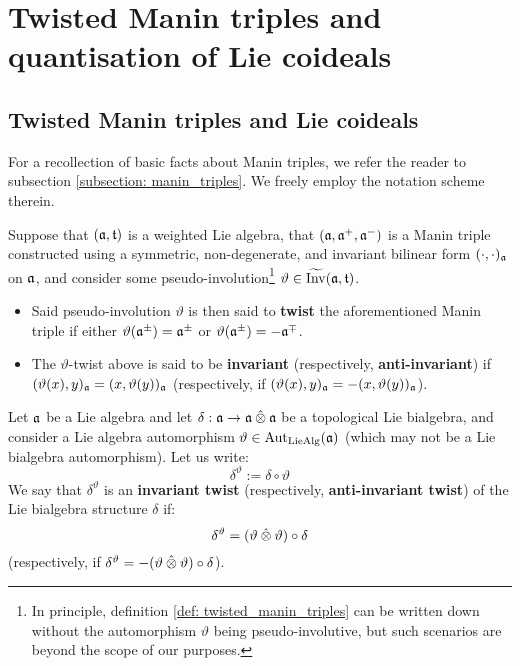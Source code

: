 \section{Twisted Manin triples and quantisation of Lie coideals}
    \subsection{Twisted Manin triples and Lie coideals}
        For a recollection of basic facts about Manin triples, we refer the reader to subsection \ref{subsection: manin_triples}. We freely employ the notation scheme therein.
    
        \begin{definition} \label{def: twisted_manin_triples}
            Suppose that $(\mathfrak{a}, \mathfrak{t})$ is a weighted Lie algebra, that $(\mathfrak{a}, \mathfrak{a}^+, \mathfrak{a}^-)$ is a Manin triple constructed using a symmetric, non-degenerate, and invariant bilinear form $(\cdot, \cdot)_{\mathfrak{a}}$ on $\mathfrak{a}$, and consider some pseudo-involution\footnote{In principle, definition \ref{def: twisted_manin_triples} can be written down without the automorphism $\vartheta$ being pseudo-involutive, but such scenarios are beyond the scope of our purposes.} $\vartheta \in \widetilde{\operatorname{Inv}}(\mathfrak{a}, \mathfrak{t})$.
            \begin{itemize}
                \item Said pseudo-involution $\vartheta$ is then said to \textbf{twist} the aforementioned Manin triple if either $\vartheta(\mathfrak{a}^{\pm}) = \mathfrak{a}^{\pm}$ or $\vartheta(\mathfrak{a}^{\pm}) = -\mathfrak{a}^{\mp}$.
                \item The $\vartheta$-twist above is said to be \textbf{invariant} (respectively, \textbf{anti-invariant}) if $( \vartheta(x), y )_{\mathfrak{a}} = ( x, \vartheta(y) )_{\mathfrak{a}}$ (respectively, if $( \vartheta(x), y )_{\mathfrak{a}} = -( x, \vartheta(y) )_{\mathfrak{a}}$).
            \end{itemize}
        \end{definition}
        \begin{definition} \label{def: twisted_lie_bialgebras}
            Let $\mathfrak{a}$ be a Lie algebra and let $\delta: \a \to \a \hattensor \a$ be a topological Lie bialgebra, and consider a Lie algebra automorphism $\vartheta \in \operatorname{Aut}_{\mathrm{Lie}\mathrm{Alg}}(\mathfrak{a})$ (which may not be a Lie bialgebra automorphism). Let us write:
                $$\delta^{\vartheta} := \delta \circ \vartheta$$
            We say that $\delta^{\vartheta}$ is an \textbf{invariant twist} (respectively, \textbf{anti-invariant twist}) of the Lie bialgebra structure $\delta$ if:
                $$\delta^{\vartheta} = (\vartheta \hattensor \vartheta) \circ \delta$$
            (respectively, if $\delta^{\vartheta} = -(\vartheta \hattensor \vartheta) \circ \delta$).
        \end{definition}
